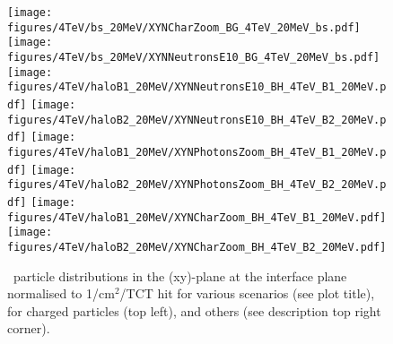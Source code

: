\begin{figure}
  \begin{center}
    \texttt{[image: figures/4TeV/bs\_20MeV/XYNCharZoom\_BG\_4TeV\_20MeV\_bs.pdf]}
    \texttt{[image: figures/4TeV/bs\_20MeV/XYNNeutronsE10\_BG\_4TeV\_20MeV\_bs.pdf]}
    \texttt{[image: figures/4TeV/haloB1\_20MeV/XYNNeutronsE10\_BH\_4TeV\_B1\_20MeV.pdf]}
    \texttt{[image: figures/4TeV/haloB2\_20MeV/XYNNeutronsE10\_BH\_4TeV\_B2\_20MeV.pdf]}
    \texttt{[image: figures/4TeV/haloB1\_20MeV/XYNPhotonsZoom\_BH\_4TeV\_B1\_20MeV.pdf]}
    \texttt{[image: figures/4TeV/haloB2\_20MeV/XYNPhotonsZoom\_BH\_4TeV\_B2\_20MeV.pdf]}
    \texttt{[image: figures/4TeV/haloB1\_20MeV/XYNCharZoom\_BH\_4TeV\_B1\_20MeV.pdf]}
    \texttt{[image: figures/4TeV/haloB2\_20MeV/XYNCharZoom\_BH\_4TeV\_B2\_20MeV.pdf]}
    
\end{center}
\vspace{-0.6cm}
 \caption{\fluka~particle distributions in the (xy)-plane at the interface plane normalised to 1/cm$^{2}$/TCT hit for various scenarios (see plot title), for charged particles (top left), and others (see description top right corner).
  \label{fig:XYNPho}}
\end{figure}

